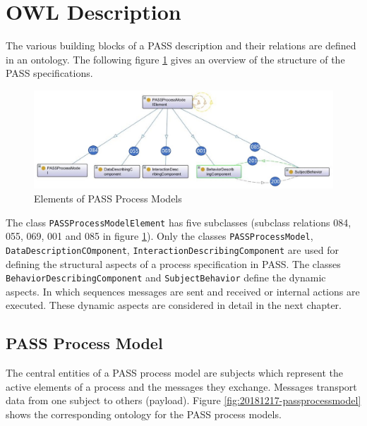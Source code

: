 \section{OWL Description}
\label{OWL-DescriptionSID}

The various building blocks of a PASS description and their relations are defined in an ontology. The following figure \ref{fig:20171217-passprocessmodellelement} gives an overview of the structure of the PASS specifications.   

\begin{figure}[htbp]
	\centering
	\includegraphics[width=0.9\linewidth]{20181026-Ontologie-Bilder/Grafiken-Ontologie/SUbject-Interaction/20171217-PASSProcessModellElement}
	\caption[Elements of PASS Process Models]{Elements of PASS Process Models}
	\label{fig:20171217-passprocessmodellelement}
\end{figure}

The class \texttt{PASSProcessModelElement} has five subclasses (subclass relations 084, 055, 069, 001 and 085 in figure \ref{fig:20171217-passprocessmodellelement}). Only the classes \texttt{PASSProcessModel}, \texttt{DataDescriptionCOmponent}, \texttt{InteractionDescribingComponent} are used for defining the structural aspects of a process specification in PASS. The classes \texttt{BehaviorDescribingComponent} and \texttt{SubjectBehavior} define the dynamic aspects. In which sequences messages are sent and received or internal actions are executed. These dynamic aspects are considered in detail in the next chapter. 

\subsection{PASS Process Model}

The central entities of a PASS process model are subjects which represent the active elements of a process and the messages they exchange. Messages transport data from one subject to others (payload). Figure \ref{fig:20181217-passprocessmodel} shows the corresponding ontology for the PASS process models.

